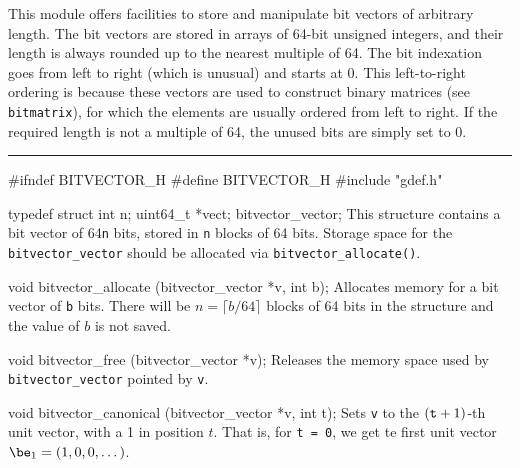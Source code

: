 
This module offers facilities to store and manipulate bit vectors of arbitrary length.
The bit vectors are stored in arrays of 64-bit unsigned integers, and their length
is always rounded up to the nearest multiple of 64.
The bit indexation goes from left to right (which is unusual) and starts at 0.
This left-to-right ordering is because these vectors are used to construct
binary matrices (see \texttt{bitmatrix}), 
for which the elements are usually ordered from left to right.
If the required length is not a multiple of 64, the unused bits are simply set to 0.

\bigskip\hrule

\code\hide
#ifndef BITVECTOR_H
#define BITVECTOR_H
\endhide
#include "gdef.h"
\endcode
\iffalse %
\code

#define bitvector_WL 64
\endcode
 \tab
Uses 64-bit words.   \pierre{Probably not needed, can be hardcoded to 64.}
 \endtab
\fi  %
\code

typedef struct{        
   int n;
   uint64_t *vect;
} bitvector_vector;
\endcode
\tab
This structure contains a bit vector of 64\texttt{n} bits, 
stored in {\tt n} blocks of 64 bits.  
Storage space for the {\tt bitvector\_vector} should be allocated via 
{\tt bitvector\_allocate()}.
\endtab
\code

void bitvector_allocate (bitvector_vector *v, int b);
\endcode
 \tab
Allocates memory for a bit vector of {\tt b} bits.
There will be $n = \lceil b/64 \rceil$ blocks of 64 bits in the structure
and the value of $b$ is not saved.
 \endtab
\code

void bitvector_free (bitvector_vector *v);
\endcode
 \tab
Releases the memory space used by {\tt bitvector\_vector} pointed by {\tt v}.
 \endtab
\code

void bitvector_canonical (bitvector_vector *v, int t);
\endcode
 \tab
Sets {\tt v} to the $({\tt t}+1)$-th unit vector, with a 1 in position $t$.
That is, for {\tt t = 0}, we get te first unit vector $\be_1 = (1,0,0,\dots)$.
 \endtab
\code

